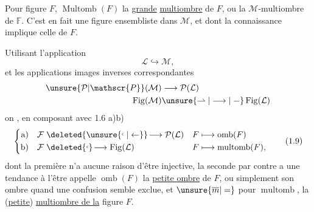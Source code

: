 
Pour  figure $F$, $\operatorname{Multomb}(F)$   la \uline{grande} \uline{multiombre} de $F$, ou la $\mathcal{M}$-multiombre de $\mathbb{F}$.  C'est en fait une figure ensembliste dans $\mathcal{M}$, et dont la connaissance implique celle de $F$.

 Utilisant   l'application
\[
\mathcal{L}\hookrightarrow\mathcal{M},
\]
et les applications images inverses correspondantes
\[
\begin{aligned}
\unsure{\mathcal{P}|\mathscr{P}}(\mathcal{M})&\longrightarrow\mathcal{P}(\mathcal{L})\\
\operatorname{Fig}(\mathcal{M})&\unsure{\rightharpoonup|\longrightarrow|\relbar}\operatorname{Fig}(\mathcal{L})
\end{aligned}
\]
on , en composant avec 1.6 a)b)
\[
\left\{\begin{aligned}
\text{a)}\quad \mathcal{F}&\mathrel{\deleted{\unsure{\lhook|\leftarrow}}\!\longrightarrow}\mathcal{P}(\mathcal{L})&
 F&\longmapsto\operatorname{omb}(F)\\
\text{b)}\quad \mathcal{F}&\mathrel{\deleted{\lhook}\!\longrightarrow}\operatorname{Fig}(\mathcal{L})&
 F&\longmapsto\operatorname{multomb}(F),
\end{aligned}\right.\tag*{(1.9)}
\]
dont la première n'a aucune raison d'être injective, la seconde par contre a une tendance à l'être   appelle $\operatorname{omb}(F)$ la \uline{petite ombre} de $F$, ou simplement son ombre quand une confusion semble exclue, et  $\unsure{\overline m|=}$ pour $\operatorname{multomb}$, la (\uline{petite}) \uline{multiombre de la} figure $F$.
